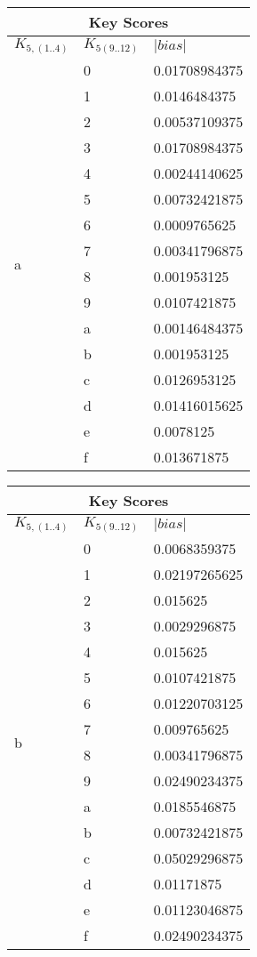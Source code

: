\documentclass{elsart}
\begin{document}
\begin{tabular}{|l|l|l|}
\hline
\multicolumn{3}{|c|}{Key Scores} \\
\hline
$K_{5,(1..4)}$ & $K_{5(9..12)}$ & $|bias|$  \\ \hline
 \multirow{16}{*}{a} & 0 & 0.01708984375 \\
 & 1 & 0.0146484375 \\
 & 2 & 0.00537109375 \\
 & 3 & 0.01708984375 \\
 & 4 & 0.00244140625 \\
 & 5 & 0.00732421875 \\
 & 6 & 0.0009765625 \\
 & 7 & 0.00341796875 \\
 & 8 & 0.001953125 \\
 & 9 & 0.0107421875 \\
 & a & 0.00146484375 \\
 & b & 0.001953125 \\
 & c & 0.0126953125 \\
 & d & 0.01416015625 \\
 & e & 0.0078125 \\
 & f & 0.013671875 \\ \hline
\end{tabular}
\begin{tabular}{|l|l|l|}
\hline
\multicolumn{3}{|c|}{Key Scores} \\
\hline
$K_{5,(1..4)}$ & $K_{5(9..12)}$ & $|bias|$  \\ \hline
 \multirow{16}{*}{b} & 0 & 0.0068359375 \\
 & 1 & 0.02197265625 \\
 & 2 & 0.015625 \\
 & 3 & 0.0029296875 \\
 & 4 & 0.015625 \\
 & 5 & 0.0107421875 \\
 & 6 & 0.01220703125 \\
 & 7 & 0.009765625 \\
 & 8 & 0.00341796875 \\
 & 9 & 0.02490234375 \\
 & a & 0.0185546875 \\
 & b & 0.00732421875 \\
 & c & 0.05029296875 \\
 & d & 0.01171875 \\
 & e & 0.01123046875 \\
 & f & 0.02490234375 \\ \hline
\end{tabular}
\end{document}
